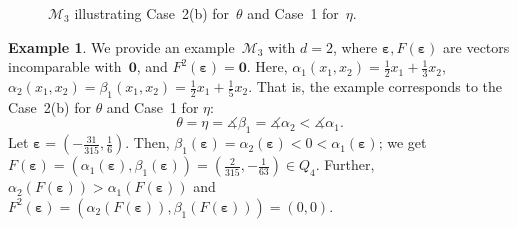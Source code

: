 \documentclass[preprint,12pt]{elsarticle}
\theoremstyle{plain}
\theoremstyle{definition}
\newtheorem{example}[theorem]{Example}
\theoremstyle{remark}
\theoremstyle{claimstyle}
\newcommand{\mdp}{\mathcal{M}}
\newcommand{\eps}{\bm{\varepsilon}}
\begin{document}
\begin{figure}[t]
\begin{minipage}[b]{0.5\columnwidth}
\begin{center}
	\end{center}
\caption{$\mdp_3$ illustrating Case~2(b) for~$\theta$ and Case~1 for~$\eta$.}
\label{fig:2d-plot}
\end{minipage}
\end{figure}
\begin{example}\label{ex:2d}
	We provide an example~$\mdp_3$ with $d=2$,
	where $\eps, F(\eps)$ are vectors incomparable with~$\bm{0}$,
	and $F^2(\eps) = \bm{0}$.
	Here, $\alpha_1(x_1, x_2) = \frac{1}{2}x_1 + \frac{1}{3}x_2$, $\alpha_2(x_1,x_2) = \beta_1(x_1, x_2) = \frac{1}{2}x_1 +\frac{1}{5}x_2$. 
	That is, the example corresponds to the Case~2(b) for $\theta$ and Case~1 for $\eta$:
	\[\theta = \eta = \measuredangle \beta_1 = \measuredangle \alpha_2 < \measuredangle \alpha_1.%
	\]
	Let $\eps = (-\frac{31}{315},\frac{1}{6})$. 
	Then,
	$\beta_1(\eps) = \alpha_2(\eps) < 0 < \alpha_1(\eps)$;
	 we get~$F(\eps) = (\alpha_1(\eps),\beta_1(\eps)) = (\frac{2}{315},-\frac{1}{63}) \in Q_4$. 
	Further, $\alpha_2(F(\eps)) > \alpha_1(F(\eps))$ and $F^2(\eps) = (\alpha_2(F(\eps)),\beta_1(F(\eps))) = (0,0)$.
\end{example}
\end{document}
